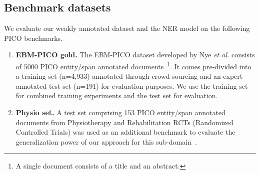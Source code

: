 \documentclass[11pt]{article}
\begin{document}
\subsection{Benchmark datasets}
\label{subsec:benchmark}
%
We evaluate our weakly annotated dataset and the NER model on the following PICO benchmarks.
%
\begin{enumerate}
    \item \textbf{EBM-PICO gold.} The EBM-PICO dataset developed by Nye \textit{et al.} consists of 5000 PICO entity/span annotated documents~\footnote{A single document consists of a title and an abstract.}. It comes pre-divided into a training set (n=4,933) annotated through crowd-sourcing and an expert annotated test set (n=191) for evaluation purposes. We use the training set for combined training experiments and the test set for evaluation.
    \item \textbf{Physio set.} A test set comprising 153 PICO entity/span annotated documents from Physiotherapy and Rehabilitation RCTs (Randomized Controlled Trials) was used as an additional benchmark to evaluate the generalization power of our approach for this sub-domain~\cite{dhrangadhariya2021end}.
\end{enumerate}
%
%
%
\end{document}
